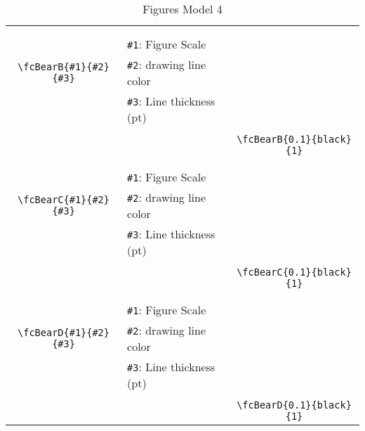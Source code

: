 \documentclass[x11names]{article}
\begin{document}
\begin{table}[H]
\begin{tabular}{|c|l|c|}
	&&\multirow{5}{*}{\fcBearB{0.1}{black}{1}}\\	&&\\	&\verb|#1|: Figure Scale &\\	\verb|\fcBearB{#1}{#2}{#3}|&	\verb|#2|: drawing line color &\\	&\verb|#3|: Line thickness (pt) &\\ &&\\&&	\verb|\fcBearB{0.1}{black}{1}|\\\hline 	
	&&\multirow{5}{*}{\fcBearC{0.1}{black}{1}}\\	&&\\	&\verb|#1|: Figure Scale &\\	\verb|\fcBearC{#1}{#2}{#3}|&	\verb|#2|: drawing line color &\\	&\verb|#3|: Line thickness (pt) &\\ &&\\&&	\verb|\fcBearC{0.1}{black}{1}|\\\hline 	
	&&\multirow{5}{*}{\fcBearD{0.1}{black}{1}}\\	&&\\	&\verb|#1|: Figure Scale &\\	\verb|\fcBearD{#1}{#2}{#3}|&	\verb|#2|: drawing line color &\\	&\verb|#3|: Line thickness (pt) &\\ &&\\&&	\verb|\fcBearD{0.1}{black}{1}|\\\hline 	\hline\end{tabular}\caption{Figures Model 4}\label{tab4}\end{table}
\end{document}

